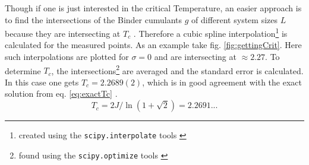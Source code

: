     Though if one is just interested in the critical Temperature, an
    easier approach is to find the intersections of the Binder cumulants
    \(g\) of different system sizes \(L\) because they are intersecting
    at \(T_c\) \cite{Binder1981}.
    Therefore a cubic spline interpolation\footnote{created using the \texttt{scipy.interpolate} tools \cite{scipy2001}}
    is calculated for the measured points.
    As an example take fig. \ref{fig:gettingCrit}.
    Here such interpolations are plotted for \(\sigma=0\) and are
    intersecting at \(\approx 2.27\).
    To determine \(T_c\), the intersections\footnote{found using the \texttt{scipy.optimize} tools \cite{scipy2001}}
    are averaged and the standard error is calculated. In this case one
    gets \(T_c = 2.2689(2)\), which is in good agreement with the
    exact solution from eq. \eqref{eq:exactTc} \cite{Onsager1944}.
    \begin{equation}
        T_c = 2J/\ln(1+\sqrt 2) = 2.2691...
        \label{eq:exactTc}
    \end{equation}

